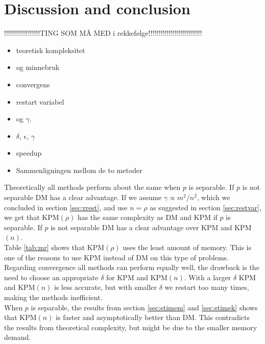 \chapter{Discussion and conclusion}%
!!!!!!!!!!!!!!!!!!TING SOM MÅ MED i rekkefølge!!!!!!!!!!!!!!!!!!!!!!!!!!!\\
\begin{itemize}
\item teoretisk kompleksitet
\item og minnebruk
\item convergens
\item restart variabel
\item og $\gamma$.
\item $\delta$, $\epsilon$, $\gamma$
\item speedup
\item Sammenligningen mellom de to metoder
\end{itemize}
Theoretically all methods perform about the same when $p$ is separable. If $p$ is not separable DM has a clear advantage. If we assume $\gamma \propto m^2/n^2$, which we concluded in section \ref{sec:rrest}, and use $n = \rho$ as suggested in section \ref{sec:restvar}, we get that KPM$(\rho)$ has the same complexity as DM and KPM if $p$ is separable. If $p$ is not separable DM has a clear advantage over KPM and KPM$(n)$. \\

Table \ref{tab:mr} shows that KPM$(\rho)$ uses the least amount of memory. This is one of the reasons to use KPM instead of DM on this type of problems. \\


Regarding convergence all methods can perform equally well, the drawback is the need to choose an appropriate $\delta$ for KPM and KPM$(n)$. With a larger $\delta$ KPM and KPM$(n)$ is less accurate, but with smaller $\delta$ we restart too many times, making the methods inefficient. \\

When $p$ is separable, the results from section \ref{sec:stimem} and \ref{sec:stimek} shows that KPM$(n)$ is faster and asymptotically better than DM. This contradicts the results from theoretical complexity, but might be due to the smaller memory demand. \\

